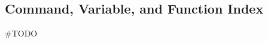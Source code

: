 \documentclass[class=book, crop=false]{standalone}
\begin{document}
\begin{CJK}{UTF8}{gbsn}

\chapter*{Command, Variable, and Function Index}

\#TODO

\cleardoublepage

\end{CJK}
\end{document}

